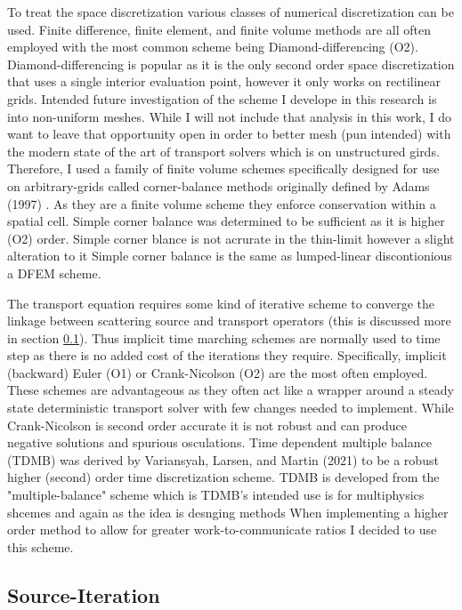 To treat the space discretization various classes of numerical discretization can be used.
Finite difference, finite element, and finite volume methods are all often employed with the most common scheme being Diamond-differencing (O2).
Diamond-differencing is popular as it is the only second order space discretization that uses a single interior evaluation point, however it only works on rectilinear grids.
Intended future investigation of the scheme I develope in this research is into non-uniform meshes.
While I will not include that analysis in this work, I do want to leave that opportunity open in order to better mesh (pun intended) with the modern state of the art of transport solvers which is on unstructured girds.
Therefore, I used a family of finite volume schemes specifically designed for use on arbitrary-grids called corner-balance methods originally defined by Adams (1997) \cite{adams_subcell_1997}.
As they are a finite volume scheme they enforce conservation within a spatial cell.
Simple corner balance was determined to be sufficient as it is higher (O2) order.
Simple corner blance is not acrurate in the thin-limit however a slight alteration to it 
Simple corner balance is the same as lumped-linear discontionious a DFEM scheme.
\cite{colomer_parallel_2013}

The transport equation requires some kind of iterative scheme to converge the linkage between scattering source and transport operators (this is discussed more in section \ref{sec:intro_itterative-scheme}).
Thus implicit time marching schemes are normally used to time step as there is no added cost of the iterations they require.
Specifically, implicit (backward) Euler (O1) or Crank-Nicolson (O2) are the most often employed.
These schemes are advantageous as they often act like a wrapper around a steady state deterministic transport solver with few changes needed to implement.
While Crank-Nicolson is second order accurate it is not robust and can produce negative solutions and spurious osculations.
Time dependent multiple balance (TDMB) was derived by Variansyah, Larsen, and Martin (2021) \cite{variansyah_robust_2021} to be a robust higher (second) order time discretization scheme.
TDMB is developed from the "multiple-balance" scheme which is
TDMB's intended use is for multiphysics shcemes and again as the idea is desnging methods 
When implementing a higher order method to allow for greater work-to-communicate ratios I decided to use this scheme. 

\subsection{Source-Iteration}
\label{sec:intro_itterative-scheme}

